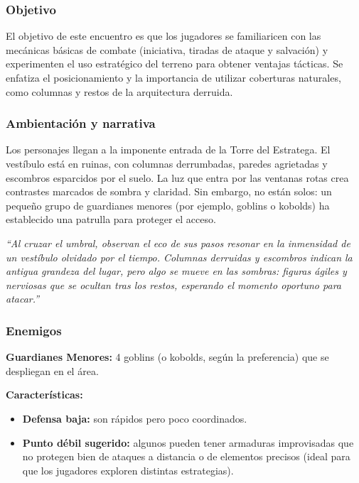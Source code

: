 \documentclass[
  twocolumn]{article}
\providecommand{\tightlist}{%
  \setlength{\itemsep}{0pt}\setlength{\parskip}{0pt}}
\begin{document}
\subsubsection{Objetivo}\label{objetivo}

El objetivo de este encuentro es que los jugadores se familiaricen con
las mecánicas básicas de combate (iniciativa, tiradas de ataque y
salvación) y experimenten el uso estratégico del terreno para obtener
ventajas tácticas. Se enfatiza el posicionamiento y la importancia de
utilizar coberturas naturales, como columnas y restos de la arquitectura
derruida.

\subsubsection{Ambientación y
narrativa}\label{ambientaciuxf3n-y-narrativa}

Los personajes llegan a la imponente entrada de la Torre del Estratega.
El vestíbulo está en ruinas, con columnas derrumbadas, paredes
agrietadas y escombros esparcidos por el suelo. La luz que entra por las
ventanas rotas crea contrastes marcados de sombra y claridad. Sin
embargo, no están solos: un pequeño grupo de guardianes menores (por
ejemplo, goblins o kobolds) ha establecido una patrulla para proteger el
acceso.

\emph{``Al cruzar el umbral, observan el eco de sus pasos resonar en la
inmensidad de un vestíbulo olvidado por el tiempo. Columnas derruidas y
escombros indican la antigua grandeza del lugar, pero algo se mueve en
las sombras: figuras ágiles y nerviosas que se ocultan tras los restos,
esperando el momento oportuno para atacar.''}

\subsubsection{Enemigos}\label{enemigos}

\textbf{Guardianes Menores:} 4 goblins (o kobolds, según la preferencia)
que se despliegan en el área.

\textbf{Características:}

\begin{itemize}
\tightlist
\item
  \textbf{Defensa baja:} son rápidos pero poco coordinados.
\item
  \textbf{Punto débil sugerido:} algunos pueden tener armaduras
  improvisadas que no protegen bien de ataques a distancia o de
  elementos precisos (ideal para que los jugadores exploren distintas
  estrategias).
\end{itemize}
\end{document}
